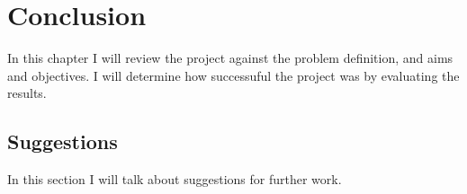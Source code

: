 \chapter{Conclusion}
In this chapter I will review the project against the problem definition, and aims and objectives. I will determine how successuful the project was by evaluating the results.

\section{Suggestions}
In this section I will talk about suggestions for further work.

